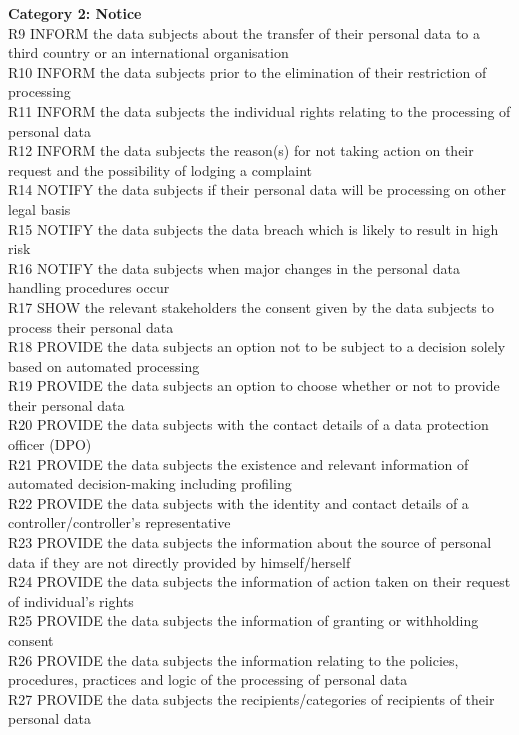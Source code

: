 \noindent \textbf{Category 2: Notice}\\
R9 INFORM the data subjects about the transfer of their personal data to a third country or an international organisation \\
R10 INFORM the data subjects prior to the elimination of their restriction of processing \\
R11 INFORM the data subjects the individual rights relating to the processing of personal data \\
R12 INFORM the data subjects the reason(s) for not taking action on their request and the possibility of lodging a complaint \\
R14 NOTIFY the data subjects if their personal data will be processing on other legal basis \\
R15	NOTIFY the data subjects the data breach which is likely to result in high risk \\
R16 NOTIFY the data subjects when major changes in the personal data handling procedures occur \\
R17 SHOW the relevant stakeholders the consent given by the data subjects to process their personal data \\
R18 PROVIDE the data subjects an option not to be subject to a decision solely based on automated processing \\
R19 PROVIDE the data subjects an option to choose whether or not to provide their personal data \\
R20 PROVIDE the data subjects with the contact details of a data protection officer (DPO) \\
R21 PROVIDE the data subjects the existence and relevant information of automated decision-making including profiling \\
R22 PROVIDE the data subjects with the identity and contact details of a controller/controller's representative \\
R23 PROVIDE the data subjects the information about the source of personal data if they are not directly provided by himself/herself \\
R24	PROVIDE the data subjects the information of action taken on their request of individual's rights \\
R25	PROVIDE the data subjects the information of granting or withholding consent \\
R26	PROVIDE the data subjects the information relating to the policies, procedures, practices and logic of the processing of personal data \\
R27	PROVIDE the data subjects the recipients/categories of recipients of their personal data \\
